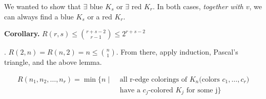 We wanted to show that $\exists$ blue $K_s$ or $\exists$ red $K_r$.
In both cases, \emph{together with $v$}, we can always find a blue $K_s$ or a red $K_r$.

\textbf{Corollary.} $R(r,s) ≤ {r+s-2 \choose r-1} ≤ 2^{r+s-2}$

\Proof. $R(2,n) = R(n,2) = n ≤ {n \choose 1}$. From there, apply induction, Pascal's triangle, and the above lemma.

\begin{definition}
\begin{align*}
  R(n_1,n_2,\ldots,n_r) = \min \{ n \mid
    &\text{ all r-edge colorings of $K_n$
      (colors $c_1,\ldots,c_r$)} \\
    & \text{ have a $c_j$-colored $K_j$ for some j}\}
\end{align*}
\end{definition}
